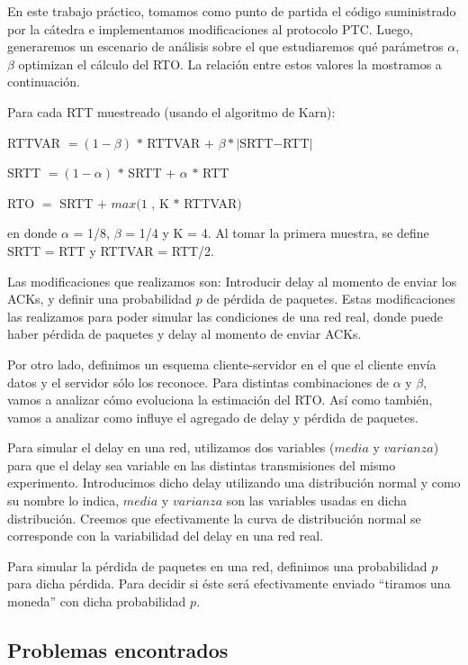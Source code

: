 En este trabajo práctico, tomamos como punto de partida el código suministrado por la cátedra e implementamos modificaciones al protocolo PTC. Luego, generaremos un escenario de análisis sobre el que estudiaremos qué parámetros $\alpha$, $\beta$ optimizan el cálculo del RTO. La relación entre estos valores la mostramos a continuación.

Para cada RTT muestreado (usando el algoritmo de Karn):

\indent \indent RTTVAR $= (1-\beta)$ $*$ RTTVAR $ +$ $\beta * |$SRTT$-$RTT$|$

\indent \indent SRTT $= (1-\alpha)$ $*$ SRTT $+$ $\alpha$ $*$ RTT

\indent \indent RTO $=$ SRTT $+$ $max (1$ , K $*$ RTTVAR$)$

en donde $\alpha$ = 1/8, $\beta$ = 1/4 y K = 4. Al tomar la primera muestra, se define SRTT = RTT y RTTVAR = RTT/2.

Las modificaciones que realizamos son: Introducir delay al momento de enviar los ACKs, y definir una probabilidad $p$ de pérdida de paquetes. Estas modificaciones las realizamos para poder simular las condiciones de una red real, donde puede haber pérdida de paquetes y delay al momento de enviar ACKs.

Por otro lado, definimos un esquema cliente-servidor en el que el cliente envía datos y el servidor sólo los reconoce. Para distintas combinaciones de $\alpha$ y $\beta$, vamos a analizar cómo evoluciona la estimación del RTO. Así como también, vamos a analizar como influye el agregado de delay y pérdida de paquetes.

Para simular el delay en una red, utilizamos dos variables ($media$ y $varianza$) para que el delay sea variable en las distintas transmisiones del mismo experimento. Introducimos dicho delay utilizando una distribución normal y como su nombre lo indica, $media$ y $varianza$ son las variables usadas en dicha distribución. Creemos que efectivamente la curva de distribución normal se corresponde con la variabilidad del delay en una red real.

Para simular la pérdida de paquetes en una red, definimos una probabilidad $p$ para dicha pérdida. Para decidir si éste será efectivamente enviado “tiramos una moneda” con dicha probabilidad $p$.

\subsection{Problemas encontrados}

